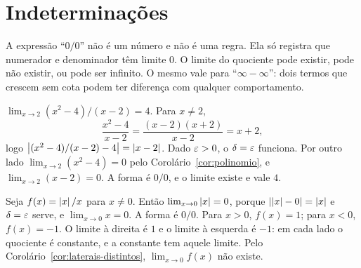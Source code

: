 \documentclass[11pt,a4paper]{article}
\begin{document}
\section{Indetermina\c{c}\~oes}
\label{sec:indet}

A express\~ao ``$0/0$'' n\~ao \'e um n\'umero e n\~ao \'e uma regra. Ela s\'o registra que numerador e denominador t\^em limite $0$. O limite do quociente pode existir, pode n\~ao existir, ou pode ser infinito. O mesmo vale para ``$\infty-\infty$'': dois termos que crescem sem cota podem ter diferen\c{c}a com qualquer comportamento.

\begin{exemplo}
\label{ex:zero-existe}
$\lim_{x\to 2}(x^2-4)/(x-2)=4$. Para $x\neq 2$,
\[
\frac{x^2-4}{x-2}=\frac{(x-2)(x+2)}{x-2}=x+2,
\]
logo $\left\lvert (x^2-4)/(x-2)-4 \right\rvert=\left\lvert x-2 \right\rvert$. Dado $\varepsilon>0$, o $\delta=\varepsilon$ funciona. Por outro lado $\lim_{x\to 2}(x^2-4)=0$ pelo Corol\'ario~\ref{cor:polinomio}, e $\lim_{x\to 2}(x-2)=0$. A forma \'e $0/0$, e o limite existe e vale $4$.
\end{exemplo}

\begin{exemplo}
\label{ex:zero-nao}
Seja $f(x)=\left\lvert x \right\rvert/x$ para $x\neq 0$. Ent\~ao $\lim_{x\to 0}\left\lvert x \right\rvert=0$, porque $\left\lvert \left\lvert x \right\rvert-0 \right\rvert=\left\lvert x \right\rvert$ e $\delta=\varepsilon$ serve, e $\lim_{x\to 0}x=0$. A forma \'e $0/0$. Para $x>0$, $f(x)=1$; para $x<0$, $f(x)=-1$. O limite \`a direita \'e $1$ e o limite \`a esquerda \'e $-1$: em cada lado o quociente \'e constante, e a constante tem aquele limite. Pelo Corol\'ario~\ref{cor:laterais-distintos}, $\lim_{x\to 0}f(x)$ n\~ao existe.
\end{exemplo}
\end{document}
